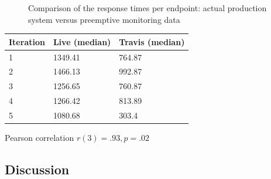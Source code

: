 \documentclass[conference]{IEEEtran}
\begin{document}

\begin{figure}
	\centering
	\quad
	\caption{Comparison of the response times per endpoint: actual production system versus preemptive monitoring data}
	\label{fig:preemptive}
\end{figure}


\begin{table}[h]
	\begin{tabular}{lll}
		\toprule
		Iteration & \bfseries Live (median) & \bfseries Travis (median)\\
		\midrule
		1 & 1349.41 & 764.87\\ 
		2 & 1466.13 & 992.87\\
		3 & 1256.65 & 760.87\\
		4 & 1266.42 & 813.89\\
		5 & 1080.68 & 303.4\\
		\bottomrule
	\end{tabular}
\end{table}

Pearson correlation $r(3)=.93, p=.02$

\subsection{Discussion}
\end{document}
